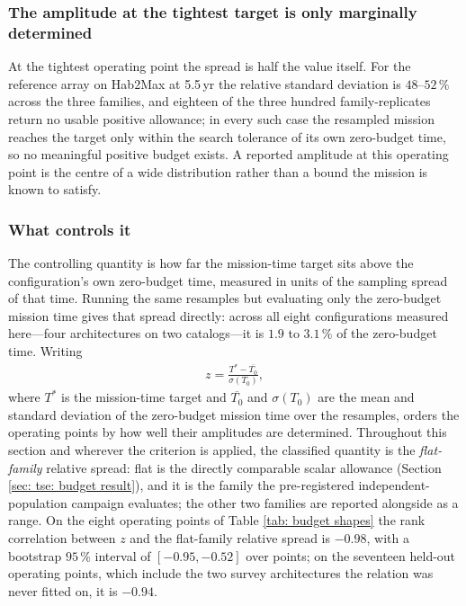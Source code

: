 \documentclass[12pt,a4paper]{article}
\numberwithin{equation}{section}
\numberwithin{figure}{section}
\numberwithin{table}{section}
\begin{document}
\subsubsection*{The amplitude at the tightest target is only marginally determined}
At the tightest operating point the spread is half the value itself. For the reference array on Hab2Max at 5.5\,yr the relative standard deviation is $48$--$52\,\%$ across the three families, and eighteen of the three hundred family-replicates return no usable positive allowance; in every such case the resampled mission reaches the target only within the search tolerance of its own zero-budget time, so no meaningful positive budget exists. A reported amplitude at this operating point is the centre of a wide distribution rather than a bound the mission is known to satisfy.

\subsubsection*{What controls it}
The controlling quantity is how far the mission-time target sits above the configuration's own zero-budget time, measured in units of the sampling spread of that time. Running the same resamples but evaluating only the zero-budget mission time gives that spread directly: across all eight configurations measured here---four architectures on two catalogs---it is $1.9$ to $3.1\,\%$ of the zero-budget time. Writing
\begin{align}
z=\frac{T^\ast-\overline{T_0}}{\sigma(T_0)},
\end{align}
where $T^\ast$ is the mission-time target and $\overline{T_0}$ and $\sigma(T_0)$ are the mean and standard deviation of the zero-budget mission time over the resamples, orders the operating points by how well their amplitudes are determined. Throughout this section and wherever the criterion is applied, the classified quantity is the \emph{flat-family} relative spread: flat is the directly comparable scalar allowance (Section \ref{sec: tse: budget result}), and it is the family the pre-registered independent-population campaign evaluates; the other two families are reported alongside as a range. On the eight operating points of Table \ref{tab: budget shapes} the rank correlation between $z$ and the flat-family relative spread is $-0.98$, with a bootstrap $95\,\%$ interval of $[-0.95, -0.52]$ over points; on the seventeen held-out operating points, which include the two survey architectures the relation was never fitted on, it is $-0.94$.
\end{document}
